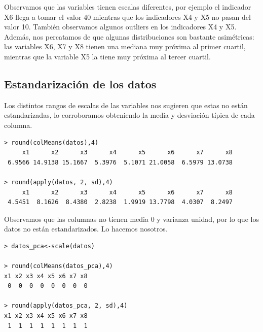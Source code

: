 \documentclass[12pt]{article}
\begin{document}
Observamos que las variables tienen escalas diferentes, por ejemplo el
indicador X6 llega a tomar el valor 40 mientras que los indicadores X4
y X5 no pasan del valor 10. También observamos algunos outliers en los
indicadores X4 y X5. Además, nos percatamos de que algunas
distribuciones son bastante asimétricas: las variables X6, X7 y X8
tienen una mediana muy próxima al primer cuartil, mientras que la
variable X5 la tiene muy próxima al tercer cuartil.

\subsection{Estandarización de los datos}

Los distintos rangos de escalas de las variables nos sugieren que
estas no están estandarizadas, lo corroboramos obteniendo la media y desviación típica de cada columna.

\begin{verbatim}
> round(colMeans(datos),4)
     x1      x2      x3      x4      x5      x6      x7      x8 
 6.9566 14.9138 15.1667  5.3976  5.1071 21.0058  6.5979 13.0738 

> round(apply(datos, 2, sd),4)
     x1      x2      x3      x4      x5      x6      x7      x8 
 4.5451  8.1626  8.4380  2.8238  1.9919 13.7798  4.0307  8.2497 
\end{verbatim}

Observamos que las columnas no tienen media 0 y varianza unidad, por
lo que los datos no están estandarizados. Lo hacemos nosotros.

\begin{verbatim}
> datos_pca<-scale(datos)

> round(colMeans(datos_pca),4)
x1 x2 x3 x4 x5 x6 x7 x8 
 0  0  0  0  0  0  0  0 

> round(apply(datos_pca, 2, sd),4)
x1 x2 x3 x4 x5 x6 x7 x8 
 1  1  1  1  1  1  1  1 
\end{verbatim}
\end{document}

